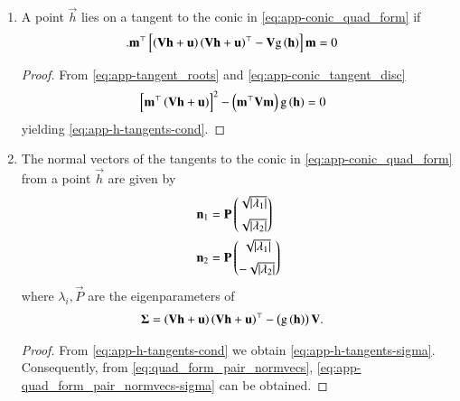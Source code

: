 \begin{enumerate}[label=\thesubsection.\arabic*.,ref=\thesubsection.\theenumi]
\begin{proof}
\begin{multline}
	\\
	+ 2 \brak{- \frac{\vec{m}^\top(\vec{Vh}+\vec{u})}{\vec{m}^\top\vec{V}\vec{n}}}\vec{n}^{\top}\brak{\vec{V}\vec{h}+\vec{u}} 
+  \text{g}\brak{
  \vec{h}
	  }
	= 0
\end{multline}
	yielding
	\eqref{eq:app-point_of_tangency-m}.
\end{proof}
\item  A point $\vec{h}$ lies on a tangent to the conic in \eqref{eq:app-conic_quad_form} if 
\begin{align}
	  \label{eq:app-h-tangents-cond}.
  \mathbf{m}^{\top}  {}\left[\left(\mathbf{V}\mathbf{h}+\mathbf{u}\right)
	  \left(\mathbf{V}\mathbf{h}+\mathbf{u}\right)^{\top}
   -\mathbf{V}
	  \text{g}\left(
  \mathbf{h}
	  \right)
	  \right]\mathbf{m} 
	  &= 0                                                                                             
\end{align}
\begin{proof}
 From \eqref{eq:app-tangent_roots}
 and
  \eqref{eq:app-conic_tangent_disc}
  \begin{align}
  {}\left[
  \mathbf{m}^{\top}\left(\mathbf{V}\mathbf{h}+\mathbf{u}\right)
  \right]^2 -\left(\mathbf{m}^{\top}\mathbf{V}\mathbf{m}\right)
	  \text{g}\left(
  \mathbf{h}
	  \right)
	  &= 0                                                                                             
  \label{eq:app-conic_tangent_disc-h}
  \end{align}                    
  yielding
	  \eqref{eq:app-h-tangents-cond}.
\end{proof}
\item
	The normal vectors of the tangents 
to the conic in \eqref{eq:app-conic_quad_form} 
	from 
	a point $\vec{h}$ 
	are given by 
  \begin{align} 
  \label{eq:app-quad_form_pair_normvecs-sigma}
  \begin{split}
  \mathbf{n}_1 &= \mathbf{P}\begin{pmatrix}\sqrt{\left\vert\lambda_1\right\vert} \\[2mm]  \sqrt{\left\vert\lambda_2\right\vert}\end{pmatrix}
  \\
  \mathbf{n}_2 &= \mathbf{P}\begin{pmatrix}\sqrt{\left\vert\lambda_1\right\vert} \\[2mm] - \sqrt{\left\vert\lambda_2\right\vert}\end{pmatrix}
  \end{split}
  \end{align} 
  where $\lambda_i, \vec{P}$ are the eigenparameters of 
  \begin{align} 
		\bm{\Sigma} &= 
	   \left(\mathbf{V}\mathbf{h}+\mathbf{u}\right)
	  \left(\mathbf{V}\mathbf{h}+\mathbf{u}\right)^{\top}
   -
  \left(
	  \text{g}\left(
  \mathbf{h}
	  \right)
  \right)\mathbf{V}.
	  \label{eq:app-h-tangents-sigma}
  \end{align}                    
  \begin{proof}
	  From 
	  \eqref{eq:app-h-tangents-cond} we obtain
	  \eqref{eq:app-h-tangents-sigma}.  Consequently, from 
  \eqref{eq:quad_form_pair_normvecs}, 
  \eqref{eq:app-quad_form_pair_normvecs-sigma}
  can be obtained.
  \end{proof}
\end{enumerate}
